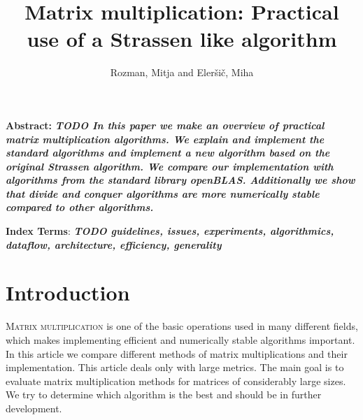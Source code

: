 \documentclass[a4paper,11pt]{article}
\title{Matrix multiplication: Practical use of a Strassen like algorithm}
\author{Rozman, Mitja and Eleršič, Miha}
\date{}
\renewenvironment{abstract}
{\begin{spacing}{1}\small\textbf{Abstract:}\bfseries\itshape}
{\end{spacing}}
\begin{document}
\maketitle



\begingroup
\renewcommand\thefootnote{}
\endgroup

\begin{abstract} %
TODO
In this paper we make an overview of practical matrix multiplication algorithms.
We explain and implement the standard algorithms and implement a new algorithm based on the original Strassen algorithm.
We compare our implementation with algorithms from the standard library openBLAS. Additionally we show that divide and conquer algorithms are more numerically stable compared to other algorithms.
\end{abstract}
\vspace{0.5cm}
\begin{spacing}{0.9}
\small\textbf{Index Terms}: \textbf{\textit{TODO guidelines, issues, experiments, algorithmics, dataflow, architecture, efficiency, generality}}
\end{spacing}


\section{Introduction}


\lettrine{M}{atrix multiplication} 
is one of the basic operations used in many different fields, which makes implementing efficient and numerically stable algorithms important. 
In this article we compare different methods of matrix multiplications and their implementation. 
This article deals only with large metrics. 
The main goal is to evaluate matrix multiplication methods for matrices of considerably large sizes. 
We try to determine which algorithm is the best and should be in further development. 
\end{document}
